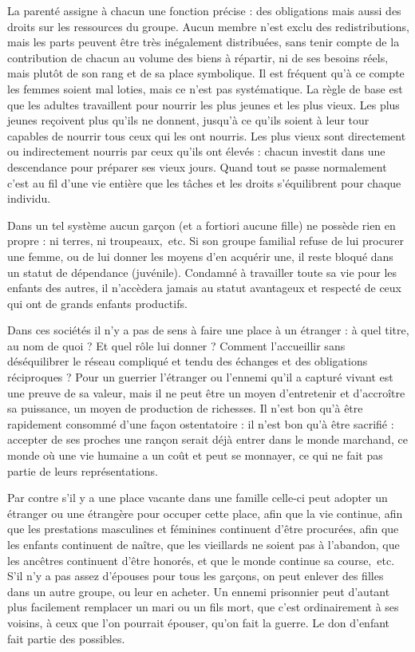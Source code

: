 La parenté assigne à chacun une fonction précise : des obligations 
mais aussi des droits sur les ressources du groupe. Aucun membre n'est exclu des redistributions, mais les parts peuvent être très 
inégalement distribuées, sans tenir compte de la contribution de chacun au volume des biens à répartir, ni de ses besoins
réels, mais plutôt de son rang et de sa place symbolique. Il est fréquent 
qu'à ce compte les femmes soient mal loties, mais ce n'est pas
systématique. La règle de base est que les adultes travaillent pour nourrir les plus 
jeunes et les plus vieux. Les plus jeunes reçoivent plus qu'ils ne donnent, 
jusqu'à ce qu'ils soient à leur tour capables de nourrir tous ceux qui les 
ont nourris. Les plus vieux sont directement ou indirectement nourris 
par ceux qu'ils ont élevés : chacun investit dans une descendance pour 
préparer ses vieux jours. Quand tout se passe normalement c'est au fil 
d'une vie entière que les tâches et les droits s'équilibrent pour chaque
individu.

Dans un tel système aucun garçon (et a fortiori aucune fille) ne 
possède rien en propre : ni terres, ni troupeaux,~etc. Si son groupe familial refuse de 
lui procurer une femme, ou de lui donner les moyens d'en acquérir une, 
il reste bloqué dans un statut de dépendance (juvénile). Condamné à
travailler toute sa vie pour les enfants des autres, il n'accèdera jamais au
statut avantageux et respecté de ceux qui ont de grands enfants productifs.

Dans ces sociétés il n'y a pas de sens à faire une place à un
étranger : à quel titre, au nom de quoi ? Et quel rôle lui donner ? Comment 
l'accueillir sans déséquilibrer le réseau compliqué et tendu des échanges 
et des obligations réciproques ? Pour un guerrier l'étranger ou l'ennemi qu'il a
capturé vivant est une preuve de sa valeur, mais il ne peut être un moyen 
d'entretenir et d'accroître sa puissance, un moyen de production de
richesses. Il n'est bon qu'à être rapidement consommé d'une façon
ostentatoire : il n'est bon qu'à être sacrifié : accepter de ses proches une
rançon serait déjà entrer dans le monde marchand, ce monde où une vie humaine a un 
coût et peut se monnayer, ce qui ne fait pas partie de leurs représentations.

Par contre s'il y a une place vacante dans une famille celle-ci peut 
adopter un étranger ou une étrangère pour occuper cette place, afin que 
la vie continue, afin que les prestations masculines et féminines
continuent d'être procurées, afin que les enfants continuent de naître, que les 
vieillards ne soient pas à l'abandon, que les ancêtres continuent d'être 
honorés, et que le monde continue sa course,~etc. S'il n'y a pas assez 
d'épouses pour tous les garçons, on peut enlever des filles dans un autre 
groupe, ou leur en acheter. Un ennemi prisonnier peut d'autant plus 
facilement remplacer un mari ou un fils mort, que c'est ordinairement à ses 
voisins, à ceux que l'on pourrait épouser, qu'on fait la guerre. Le don d'enfant fait partie des possibles.

